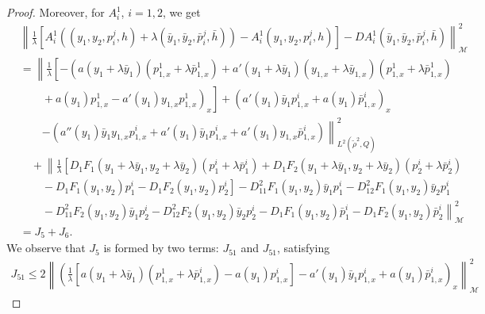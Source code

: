 \documentclass[11pt,a4paper]{amsart}
\numberwithin{equation}{section}
\begin{document}
\begin{proof}
    \noindent Moreover, for $A^1_i$, $i=1,2$, we get
    \begin{equation}
    	\begin{split}
    		&\left\| \frac{1}{\lambda}\left[ A^1_i (( y_1, y_2, p_i^j, h)+\lambda(\bar y_1,\bar y_2,\bar p_i^j,\bar h)) - A^1_i( y_1, y_2, p_i^j, h) \right] - D A^1_i(\bar y_1,\bar y_2,\bar p_i^j,\bar h) \right\|^{2}_{\mathcal{M}} \\
            &= \left\| \frac{1}{\lambda} \left[ 
            - \left(a(y_1+\lambda\bar y_1)(p_{1,x}^1 + \lambda \bar p_{1,x}^1) + a'(y_1+\lambda\bar y_1)(y_{1,x}+\lambda\bar y_{1,x})(p_{1,x}^1+\lambda\bar p_{1,x}^1) \right.\right.\right. \\
            &\left.\left.\left. \qquad + a(y_1)p_{1,x}^1 - a'(y_1)y_{1,x}p_{1,x}^1 \right)_x \right] + \left(a'(y_{1})\bar y_{1} p^i_{1,x} + a(y_{1}) \bar p^i_{1,x}\right)_x \right.\\
            &\qquad \left. - \left( a''(y_{1})\bar y_{1} y_{1,x} p^i_{1,x} + a'(y_{1})\bar y_{1}  p^i_{1,x} + a'(y_1)y_{1,x} \bar p^i_{1,x} \right)
            \right\|_{L^2(\tilde\rho^2,Q)}^2 \\
            &\quad + \left\| \frac{1}{\lambda} \left[ D_1 F_1(y_1+\lambda \bar y_1,y_2+\lambda \bar y_2) (p^i_1 +\lambda \bar p^i_1) + D_1 F_2(y_1+\lambda \bar y_1,y_2+\lambda \bar y_2) (p^i_2 +\lambda \bar p^i_2) \right.\right. \\
            &\left.\left.\qquad - D_1 F_1(y_1,y_2) p^i_1 - D_1 F_2(y_1,y_2) p^i_2 \right] - D_{11}^2 F_1(y_1,y_2)\bar y_1 p^i_1 - D_{12}^2 F_1(y_1,y_2)\bar y_2 p^i_1 \right. \\
            &\left.\qquad - D_{11}^2 F_2(y_1,y_2)\bar y_1 p^i_2 - D_{12}^2 F_2(y_1,y_2)\bar y_2 p^i_2 
            - D_1 F_1(y_1,y_2) \bar p^i_1 - D_1 F_2(y_1,y_2) \bar p^i_2
            \right\|^{2}_{\mathcal{M}} \\
            &= J_5+J_6.
    	\end{split}
    \end{equation}We observe that  $J_5$  is formed by two terms: $J_{51}$ and $J_{51}$, satisfying
    \begin{equation*}
        \begin{split}
            J_{51} \leq 2\left\| \left( \frac{1}{\lambda} \left[ a(y_1+\lambda\bar y_1)(p^1_{1,x}+\lambda\bar p^i_{1,x} ) - a(y_1)p^i_{1,x} \right] - a'(y_1)\bar y_1 p^i_{1,x} + a(y_1)\bar p^i_{1,x} \right)_x\right\|^{2}_{\mathcal{M}}

\end{split}
\end{equation*}
\end{proof}
\end{document}

